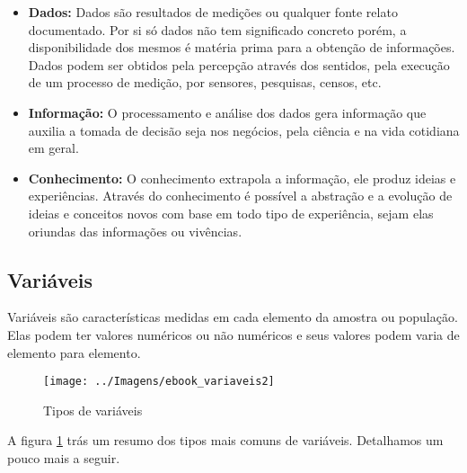 \documentclass[12pt,]{style/krantz}
\theoremstyle{definition}
\theoremstyle{definition}
\theoremstyle{definition}
\theoremstyle{remark}
\begin{document}
\begin{itemize}
\item
  \textbf{Dados: }Dados são resultados de medições ou qualquer fonte relato documentado. Por si só dados não tem significado concreto porém, a disponibilidade dos mesmos é matéria prima para a obtenção de informações. Dados podem ser obtidos pela percepção através dos sentidos, pela execução de um processo de medição, por sensores, pesquisas, censos, etc.
\item
  \textbf{Informação:} O processamento e análise dos dados gera informação que auxilia a tomada de decisão seja nos negócios, pela ciência e na vida cotidiana em geral.
\item
  \textbf{Conhecimento:} O conhecimento extrapola a informação, ele produz ideias e experiências. Através do conhecimento é possível a abstração e a evolução de ideias e conceitos novos com base em todo tipo de experiência, sejam elas oriundas das informações ou vivências.
\end{itemize}

\hypertarget{variaveis}{%
\subsection{Variáveis}\label{variaveis}}

Variáveis são características medidas em cada elemento da amostra ou população. Elas podem ter valores numéricos ou não numéricos e seus valores podem varia de elemento para elemento.

\begin{figure}[H]

{\centering \texttt{[image: ../Imagens/ebook\_variaveis2]} 

}

\caption{Tipos de variáveis}\label{fig:fig06}
\end{figure}

A figura \ref{fig:fig06} trás um resumo dos tipos mais comuns de variáveis. Detalhamos um pouco mais a seguir.
\end{document}
